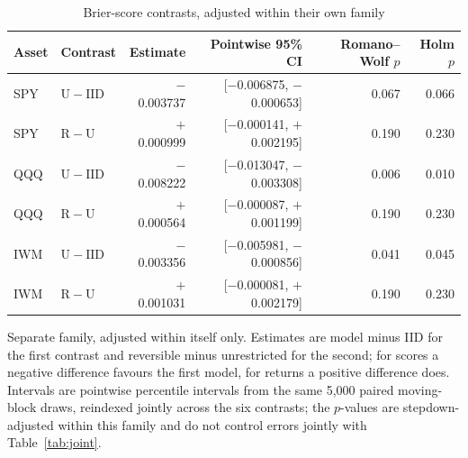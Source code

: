 \begin{table}[!htbp]\centering\small\setlength{\tabcolsep}{6pt}
\caption{Brier-score contrasts, adjusted within their own family}\label{tab:jointbrier}
\footnotesize\begin{tabular}{llrrrr}\toprule
Asset & Contrast & Estimate & Pointwise 95\% CI & Romano--Wolf $p$ & Holm $p$\\\midrule
SPY & $\mathrm{U}-\mathrm{IID}$ & $-$0.003737 & [$-$0.006875, $-$0.000653] & 0.067 & 0.066\\
SPY & $\mathrm{R}-\mathrm{U}$ & $+$0.000999 & [$-$0.000141, $+$0.002195] & 0.190 & 0.230\\
QQQ & $\mathrm{U}-\mathrm{IID}$ & $-$0.008222 & [$-$0.013047, $-$0.003308] & 0.006 & 0.010\\
QQQ & $\mathrm{R}-\mathrm{U}$ & $+$0.000564 & [$-$0.000087, $+$0.001199] & 0.190 & 0.230\\
IWM & $\mathrm{U}-\mathrm{IID}$ & $-$0.003356 & [$-$0.005981, $-$0.000856] & 0.041 & 0.045\\
IWM & $\mathrm{R}-\mathrm{U}$ & $+$0.001031 & [$-$0.000081, $+$0.002179] & 0.190 & 0.230\\
\bottomrule\end{tabular}
\par\smallskip\parbox{0.98\linewidth}{\footnotesize Separate family, adjusted within itself only. Estimates are model minus IID for the first contrast and reversible minus unrestricted for the second; for scores a negative difference favours the first model, for returns a positive difference does. Intervals are pointwise percentile intervals from the same 5,000 paired moving-block draws, reindexed jointly across the six contrasts; the $p$-values are stepdown-adjusted within this family and do not control errors jointly with Table~\ref{tab:joint}.}
\end{table}
